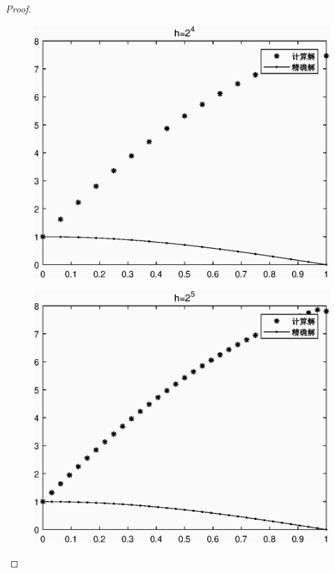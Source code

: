 \documentclass{article}%
\begin{document}
\begin{proof}
	\begin{figure}[H]
	\includegraphics[width=1\linewidth]{week15_1_4.eps}
	\label{Fig:4}
	\end{figure}

	\begin{figure}[H]
	\includegraphics[width=1\linewidth]{week15_1_5.eps}
	\label{Fig:5}
	\end{figure}


\end{proof}
\end{document}
